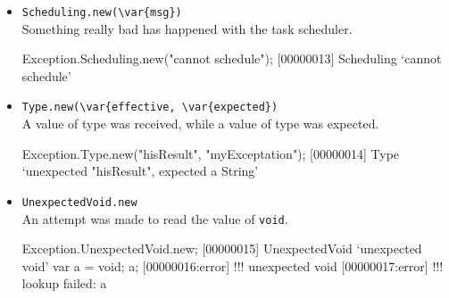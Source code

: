 \begin{itemize}
\item \lstinline|Scheduling.new(\var{msg})|\\
  Something really bad has happened with the \urbi task scheduler.
\begin{urbiscript}[firstnumber=last]
Exception.Scheduling.new("cannot schedule");
[00000013] Scheduling `cannot schedule'
\end{urbiscript}

\item \lstinline|Type.new(\var{effective, \var{expected})|\\
  A value of type  was received, while a value of type
   was expected.
\begin{urbiscript}[firstnumber=last]
Exception.Type.new("hisResult", "myExceptation");
[00000014] Type `unexpected "hisResult", expected a String'
\end{urbiscript}

\item \lstinline|UnexpectedVoid.new|\\
  An attempt was made to read the value of \lstinline|void|.
\begin{urbiscript}[firstnumber=last]
Exception.UnexpectedVoid.new;
[00000015] UnexpectedVoid `unexpected void'
var a = void;
a;
[00000016:error] !!! unexpected void
[00000017:error] !!! lookup failed: a
\end{urbiscript}

\end{itemize}


